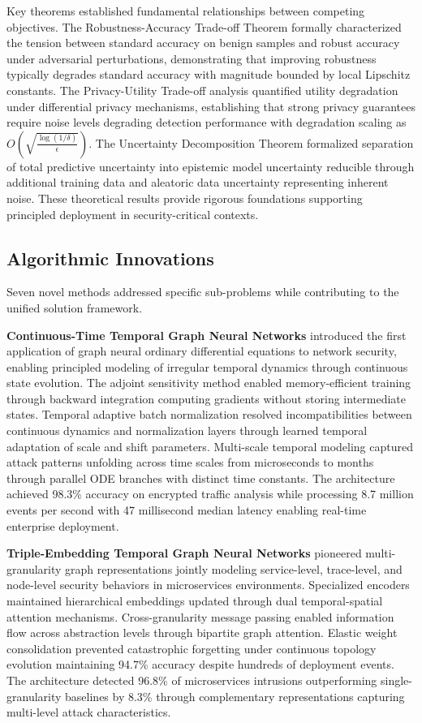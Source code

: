 Key theorems established fundamental relationships between competing objectives. The Robustness-Accuracy Trade-off Theorem formally characterized the tension between standard accuracy on benign samples and robust accuracy under adversarial perturbations, demonstrating that improving robustness typically degrades standard accuracy with magnitude bounded by local Lipschitz constants. The Privacy-Utility Trade-off analysis quantified utility degradation under differential privacy mechanisms, establishing that strong privacy guarantees require noise levels degrading detection performance with degradation scaling as $O(\sqrt{\frac{\log(1/\delta)}{\epsilon}})$. The Uncertainty Decomposition Theorem formalized separation of total predictive uncertainty into epistemic model uncertainty reducible through additional training data and aleatoric data uncertainty representing inherent noise. These theoretical results provide rigorous foundations supporting principled deployment in security-critical contexts.

\subsection*{Algorithmic Innovations}

Seven novel methods addressed specific sub-problems while contributing to the unified solution framework.

\textbf{Continuous-Time Temporal Graph Neural Networks} introduced the first application of graph neural ordinary differential equations to network security, enabling principled modeling of irregular temporal dynamics through continuous state evolution. The adjoint sensitivity method enabled memory-efficient training through backward integration computing gradients without storing intermediate states. Temporal adaptive batch normalization resolved incompatibilities between continuous dynamics and normalization layers through learned temporal adaptation of scale and shift parameters. Multi-scale temporal modeling captured attack patterns unfolding across time scales from microseconds to months through parallel ODE branches with distinct time constants. The architecture achieved 98.3\% accuracy on encrypted traffic analysis while processing 8.7 million events per second with 47 millisecond median latency enabling real-time enterprise deployment.

\textbf{Triple-Embedding Temporal Graph Neural Networks} pioneered multi-granularity graph representations jointly modeling service-level, trace-level, and node-level security behaviors in microservices environments. Specialized encoders maintained hierarchical embeddings updated through dual temporal-spatial attention mechanisms. Cross-granularity message passing enabled information flow across abstraction levels through bipartite graph attention. Elastic weight consolidation prevented catastrophic forgetting under continuous topology evolution maintaining 94.7\% accuracy despite hundreds of deployment events. The architecture detected 96.8\% of microservices intrusions outperforming single-granularity baselines by 8.3\% through complementary representations capturing multi-level attack characteristics.

